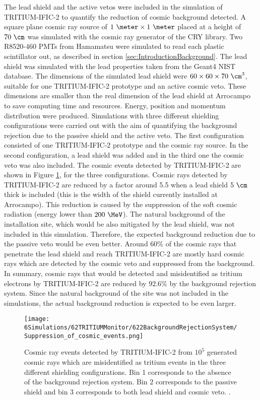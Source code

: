 The lead shield and the active vetos were included in the simulation of TRITIUM-IFIC-2 to quantify the reduction of cosmic background detected. A square plane cosmic ray source of $1~\meter \times 1~\meter$ placed at a height of $70~\cm$ was simulated with the cosmic ray generator of the CRY library. Two R8520-460 PMTs from Hamamatsu were simulated to read each plastic scintillator out, as described in section \ref{sec:IntroductionBackground}. The lead shield was simulated with the lead properties taken from the Geant4 NIST database. The dimensions of the simulated lead shield were $60 \times 60 \times 70~\cm^3$, suitable for one TRITIUM-IFIC-2 prototype and an active cosmic veto. These dimensions are smaller than the real dimension of the lead shield at Arrocampo to save computing time and resources. Energy, position and momentum distribution were produced. Simulations with three different shielding configurations were carried out with the aim of quantifying the background rejection due to the passive shield and the active veto. The first configuration consisted of one TRITIUM-IFIC-2 prototype and the cosmic ray source. In the second configuration, a lead shield was added and in the third one the cosmic veto was also included. The cosmic events detected by TRITIUM-IFIC-2 are shown in Figure \ref{fig:CosmicEventsSuppressionSimulated}, for the three configurations. Cosmic rays detected by TRITIUM-IFIC-2 are reduced by a factor around 5.5 when a lead shield $5~\cm$ thick is included (this is the width of the shield currently installed at Arrocampo). This reduction is caused by the suppression of the soft cosmic radiation (energy lower than $200~\MeV$). The natural background of the installation site, which would be also mitigated by the lead shield, was not included in this simulation. Therefore, the expected background reduction due to the passive veto would be even better. Around $60\%$ of the cosmic rays that penetrate the lead shield and reach TRITIUM-IFIC-2 are mostly hard cosmic rays which are detected by the cosmic veto and suppressed from the background. In summary, cosmic rays that would be detected and misidentified as tritium electrons by TRITIUM-IFIC-2 are reduced by $92.6\%$ by the background rejection system. Since the natural background of the site was not included in the simulations, the actual background reduction is expected to be even larger.

\begin{figure}[h]
\texttt{[image: 6Simulations/62TRITIUMMonitor/622BackgroundRejectionSystem/Suppression\_of\_cosmic\_events.png]}
\centering
\caption{Cosmic ray events detected by TRITIUM-IFIC-2 from $10^5$ generated cosmic rays which are misidentified as tritium events in the three different shielding configurations. Bin 1 corresponds to the absence of the background rejection system. Bin 2 corresponds to the passive shield and bin 3 corresponds to both lead shield and cosmic veto.  \label{fig:CosmicEventsSuppressionSimulated}.}
\end{figure}